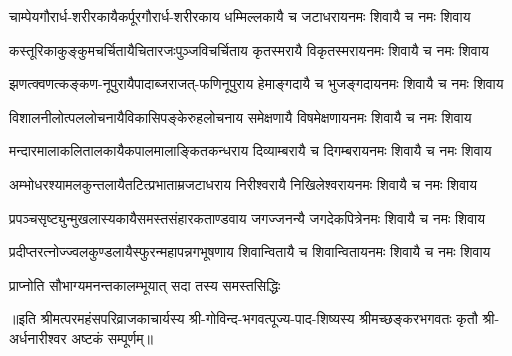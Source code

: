 

\fourlineindentedshloka
{चाम्पेयगौरार्ध-शरीरकायै}{कर्पूरगौरार्ध-शरीरकाय}
{धम्मिल्लकायै च जटाधराय}{नमः शिवायै च नमः शिवाय}

\fourlineindentedshloka
{कस्तूरिकाकुङ्कुमचर्चितायै}{चितारजःपुञ्जविचर्चिताय}
{कृतस्मरायै विकृतस्मराय}{नमः शिवायै च नमः शिवाय}

\fourlineindentedshloka
{झणत्क्वणत्कङ्कण-नूपुरायै}{पादाब्जराजत्-फणिनूपुराय}
{हेमाङ्गदायै च भुजङ्गदाय}{नमः शिवायै च नमः शिवाय}

\fourlineindentedshloka
{विशालनीलोत्पललोचनायै}{विकासिपङ्केरुहलोचनाय}
{समेक्षणायै विषमेक्षणाय}{नमः शिवायै च नमः शिवाय}

\fourlineindentedshloka
{मन्दारमालाकलितालकायै}{कपालमालाङ्कितकन्धराय}
{दिव्याम्बरायै च दिगम्बराय}{नमः शिवायै च नमः शिवाय}

\fourlineindentedshloka
{अम्भोधरश्यामलकुन्तलायै}{तटित्प्रभाताम्रजटाधराय}
{निरीश्वरायै निखिलेश्वराय}{नमः शिवायै च नमः शिवाय}

\fourlineindentedshloka
{प्रपञ्चसृष्ट्युन्मुखलास्यकायै}{समस्तसंहारकताण्डवाय}
{जगज्जनन्यै जगदेकपित्रे}{नमः शिवायै च नमः शिवाय}

\fourlineindentedshloka
{प्रदीप्तरत्नोज्ज्वलकुण्डलायै}{स्फुरन्महापन्नगभूषणाय}
{शिवान्वितायै च शिवान्विताय}{नमः शिवायै च नमः शिवाय}

{प्राप्नोति सौभाग्यमनन्तकालम्}{भूयात् सदा तस्य समस्तसिद्धिः}

{॥इति श्रीमत्परमहंसपरिव्राजकाचार्यस्य श्री-गोविन्द-भगवत्पूज्य-पाद-शिष्यस्य
श्रीमच्छङ्करभगवतः कृतौ श्री-अर्धनारीश्वर अष्टकं सम्पूर्णम्॥}
%
%
%
